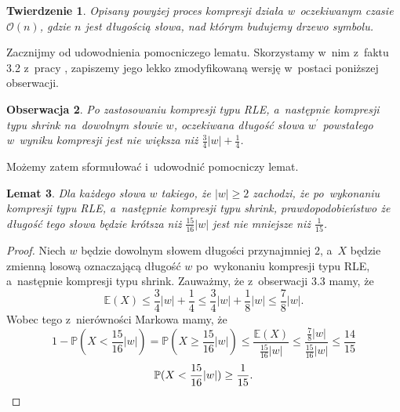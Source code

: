 \documentclass[declaration,shortabstract]{iithesis}
\theoremstyle{definition} \newtheorem{definition}{Definicja}[chapter]
\theoremstyle{plain} \newtheorem{remark}[definition]{Obserwacja}
\theoremstyle{plain} \newtheorem{theorem}[definition]{Twierdzenie}
\theoremstyle{plain} \newtheorem{example}{Przykład}[definition]
\theoremstyle{plain} \newtheorem{lemma}[definition]{Lemat}
\begin{document}
\begin{theorem}
    Opisany powyżej proces kompresji działa w~oczekiwanym czasie $\mathcal{O}(n)$, gdzie $n$ jest długością słowa, nad którym budujemy drzewo symbolu.
\end{theorem}

Zacznijmy od udowodnienia pomocniczego lematu. Skorzystamy w~nim z~faktu 3.2 z~pracy \cite{gawrychowski}, zapiszemy jego lekko zmodyfikowaną wersję w~postaci poniższej obserwacji.
\begin{remark}
    Po zastosowaniu kompresji typu RLE, a~następnie kompresji typu shrink na~dowolnym słowie $w$, oczekiwana długość słowa $w^\prime$ powstałego w~wyniku kompresji jest nie większa niż $\frac{3}{4}|w| + \frac{1}{4}$.
\end{remark}
Możemy zatem sformułować i~udowodnić pomocniczy lemat.
\begin{lemma}
    Dla każdego słowa $w$ takiego, że $|w| \geq 2$ zachodzi, że po~wykonaniu kompresji typu RLE, a~następnie kompresji typu shrink, prawdopodobieństwo że długość tego słowa będzie krótsza niż $\frac{15}{16}|w|$ jest nie mniejsze niż $\frac{1}{15}$. 
\end{lemma}
\begin{proof}
    Niech $w$ będzie dowolnym słowem długości przynajmniej $2$, a~$X$ będzie zmienną losową oznaczającą długość $w$ po~wykonaniu kompresji typu RLE, a~następnie kompresji typu shrink. Zauważmy, że z~obserwacji 3.3 mamy, że $$\mathbb{E} (X) \leq \frac{3}{4}|w| + \frac{1}{4} \leq \frac{3}{4}|w| + \frac{1}{8}|w| \leq \frac{7}{8}|w|.$$ Wobec tego z~nierówności Markowa mamy, że $$1 - \mathbb{P}(X < \frac{15}{16}|w|) = \mathbb{P}(X \geq \frac{15}{16}|w|) \leq \frac{\mathbb{E} (X)}{\frac{15}{16}|w|} \leq \frac{\frac{7}{8}|w|}{\frac{15}{16}|w|} \leq \frac{14}{15}$$ $$\mathbb{P}(X < \frac{15}{16}|w|) \geq \frac{1}{15}. \qedhere$$
\end{proof}
\end{document}
